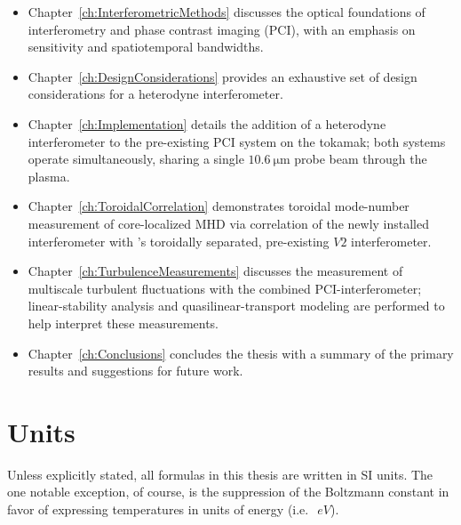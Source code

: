 \begin{itemize}
  \item Chapter~\ref{ch:InterferometricMethods} discusses
    the optical foundations of interferometry and
    phase contrast imaging (PCI),
    with an emphasis on sensitivity and spatiotemporal bandwidths.
  \item Chapter~\ref{ch:DesignConsiderations} provides
    an exhaustive set of design considerations for
    a heterodyne interferometer.
  \item Chapter~\ref{ch:Implementation} details
    the addition of a heterodyne interferometer
    to the pre-existing PCI system on the \diiid\space tokamak;
    both systems operate simultaneously,
    sharing a single $\SI{10.6}{\micro\meter}$ probe beam through the plasma.
  \item Chapter~\ref{ch:ToroidalCorrelation} demonstrates
    toroidal mode-number measurement of core-localized MHD
    via correlation of the newly installed interferometer
    with \diiid's toroidally separated, pre-existing $V2$ interferometer.
  \item Chapter~\ref{ch:TurbulenceMeasurements} discusses
    the measurement of multiscale turbulent fluctuations
    with the combined PCI-interferometer;
    linear-stability analysis and quasilinear-transport modeling
    are performed to help interpret these measurements.
  \item Chapter~\ref{ch:Conclusions} concludes the thesis
    with a summary of the primary results
    and suggestions for future work.
\end{itemize}


\section{Units}
Unless explicitly stated, all formulas in this thesis are written in SI units.
The one notable exception, of course,
is the suppression of the Boltzmann constant
in favor of expressing temperatures in units of energy
(i.e.\ $\SI{}{eV}$).





